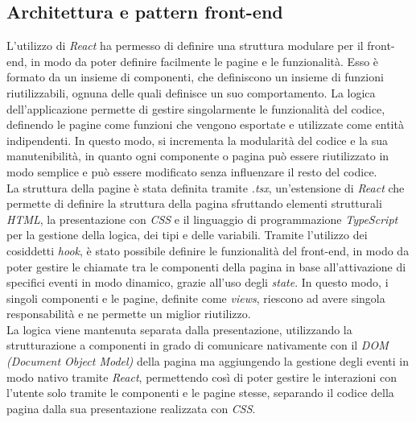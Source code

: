 \subsection{Architettura e pattern front-end}\label{subsec:architettura-pattern}

L'utilizzo di \textit{React} ha permesso di definire una struttura modulare per il front-end, in modo da poter definire facilmente le pagine e le funzionalità.
Esso è formato da un insieme di componenti, che definiscono un insieme di funzioni riutilizzabili, ognuna delle quali definisce un suo comportamento. 
La logica dell'applicazione permette di gestire singolarmente le funzionalità del codice, definendo le pagine come funzioni che vengono
esportate e utilizzate come entità indipendenti. In questo modo, si incrementa la modularità del codice e la sua manutenibilità, in quanto ogni componente
o pagina può essere riutilizzato in modo semplice e può essere modificato senza influenzare il resto del codice. \\

La struttura della pagine è stata definita tramite \textit{.tsx}, un'estensione di \textit{React} che permette di definire la struttura della pagina 
sfruttando elementi strutturali \textit{HTML}, la presentazione con \textit{CSS} e il linguaggio di programmazione \textit{TypeScript} per la gestione della logica, dei tipi e delle variabili.
Tramite l'utilizzo dei cosiddetti \textit{hook}, è stato possibile definire le funzionalità del front-end, in modo da poter gestire le chiamate tra le componenti della 
pagina in base all'attivazione di specifici eventi in modo dinamico, grazie all'uso degli \textit{state}.
In questo modo, i singoli componenti e le pagine, definite come \textit{views}, riescono ad avere singola responsabilità e ne permette un miglior riutilizzo. \\

La logica viene mantenuta separata dalla presentazione, utilizzando la strutturazione a componenti in grado di comunicare nativamente con il 
\textit{DOM (Document Object Model)} della pagina ma aggiungendo la gestione degli eventi in modo nativo tramite \textit{React}, permettendo così di poter gestire le interazioni con l'utente
solo tramite le componenti e le pagine stesse, separando il codice della pagina dalla sua presentazione realizzata con \textit{CSS}. \\

